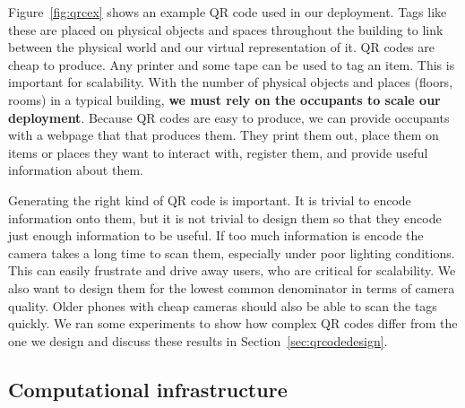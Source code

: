 Figure~\ref{fig:qrcex} shows an example QR code used in our deployment.  Tags like these are placed on physical
objects and spaces throughout the building to link between the physical world and our virtual representation of it.
QR codes are cheap to produce.  Any printer and some tape can be used to tag an item.  This is important for scalability.
With the number of physical objects and places (floors, rooms) in a typical building, {\bf we must rely on the occupants
to scale our deployment}. Because QR codes are easy to produce, we can provide occupants with a webpage that
that produces them.  They print them out, place them on items or
places they want to interact with, register them, and provide useful
information about them.

Generating the right kind of QR code is important.  It is trivial to
encode information onto them, but it is
not trivial to design them so that they encode just enough information to be useful.  If 
too much information is encode the camera takes a long time to scan them, especially under poor lighting
conditions.  This can easily frustrate and drive away users, who are critical for scalability.
We also want to design them for the lowest common denominator in terms of camera quality.  Older
phones with cheap cameras should also be able to scan the tags quickly.  We ran some experiments to show
how complex QR codes differ from the one we design and discuss these results in Section~\ref{sec:qrcodedesign}.


\subsection{Computational infrastructure}

